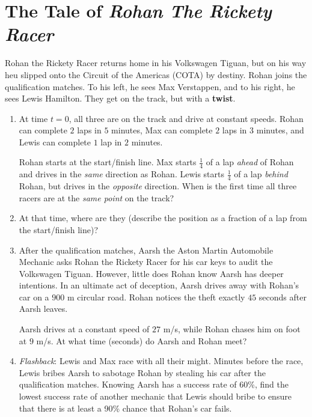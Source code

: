 \documentclass[a4paper]{article}
\begin{document}
    \newpage
    \section*{The Tale of \textit{Rohan The Rickety Racer}}
    
    Rohan the Rickety Racer returns home in his Volkswagen Tiguan, but on his way heu slipped onto the Circuit of the Americas (COTA) by destiny. Rohan joins the qualification matches. To his left, he sees Max Verstappen, and to his right, he sees Lewis Hamilton. They get on the track, but with a \textbf{twist}.
    
    
    \begin{enumerate}[itemsep=2.3cm]
    
    \item At time $t=0$, all three are on the track and drive at constant speeds.
    Rohan can complete $2$ laps in $5$ minutes, Max can complete $2$ laps in $3$ minutes, and Lewis can complete $1$ lap in $2$ minutes.
    \vspace{0.3cm}
    
    Rohan starts at the start/finish line. Max starts $\tfrac14$ of a lap \emph{ahead} of Rohan and drives in the \emph{same} direction as Rohan. Lewis starts $\tfrac14$ of a lap \emph{behind} Rohan, but drives in the \emph{opposite} direction. When is the first time all three racers are at the \emph{same point} on the track?
    
    \item At that time, where are they (describe the position as a fraction of a lap from the start/finish line)?

    \item After the qualification matches, Aarsh the Aston Martin Automobile Mechanic asks Rohan the Rickety Racer for his car keys to audit the Volkswagen Tiguan. However, little does Rohan know Aarsh has deeper intentions. In an ultimate act of deception, Aarsh drives away with Rohan's car on a $900$ m circular road. Rohan notices the theft exactly $45$ seconds after Aarsh leaves.
    \vspace{0.3cm}
    
    Aarsh drives at a constant speed of $27$ m/s, while Rohan chases him on foot at $9$ m/s. At what time (seconds) do Aarsh and Rohan meet?

    \item \textit{Flashback}: Lewis and Max race with all their might. Minutes before the race, Lewis bribes Aarsh to sabotage Rohan by stealing his car after the qualification matches. Knowing Aarsh has a success rate of 60\%, find the lowest success rate of another mechanic that Lewis should bribe to ensure that there is at least a 90\% chance that Rohan's car fails.


\end{enumerate}
\end{document}
